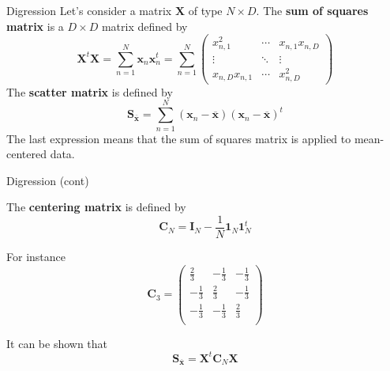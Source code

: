 \documentclass{beamer}
\begin{document}
\begin{frame}{Digression}
	Let's consider a matrix $\textbf{X}$ of type $N\times D$. The \textbf{sum of squares matrix}
	is a $D\times D$ matrix defined by
	\begin{equation*}
		\textbf{X}^t \textbf{X}=\sum_{n=1}^{N} \textbf{x}_n \textbf{x}_n^t=\sum_{n=1}^N 
		\begin{pmatrix}
			x_{n,1}^2 & \cdots & x_{n,1}x_{n,D}\\
			\vdots & \ddots & \vdots \\
			x_{n,D}x_{n,1}&\cdots & x_{n,D}^2
		\end{pmatrix}
	\end{equation*} 
	The \textbf{scatter matrix} is defined by
	\begin{equation*}
		\textbf{S}_{\overline{\textbf{x}}}= \sum_{n=1}^{N} 
		(\textbf{x}_n -\overline{\textbf{x}})
		(\textbf{x}_n -\overline{\textbf{x}})^t
	\end{equation*}
	The last expression means that the sum of squares matrix is applied to mean-centered data.
\end{frame}
\begin{frame}{Digression (cont)}
	
	The \textbf{centering matrix} is defined by
	\begin{equation*}
		\textbf{C}_N = \textbf{I}_N - \frac{1}{N} \textbf{1}_N \textbf{1}_N^t
	\end{equation*}
	
	For instance 
	\begin{equation*}
		\textbf{C}_3 = \begin{pmatrix}
			\frac{2}{3} & -\frac{1}{3} & -\frac{1}{3} \\
			-\frac{1}{3} & \frac{2}{3} & -\frac{1}{3} \\
				-\frac{1}{3} & -\frac{1}{3} & \frac{2}{3} \\	
		\end{pmatrix}
	\end{equation*}
	
	It can be shown that 
	\begin{equation*}
		\textbf{S}_{\overline{\textbf{x}}}= \textbf{X}^t\textbf{C}_N\textbf{X}
	\end{equation*}
\end{frame}
\end{document}
